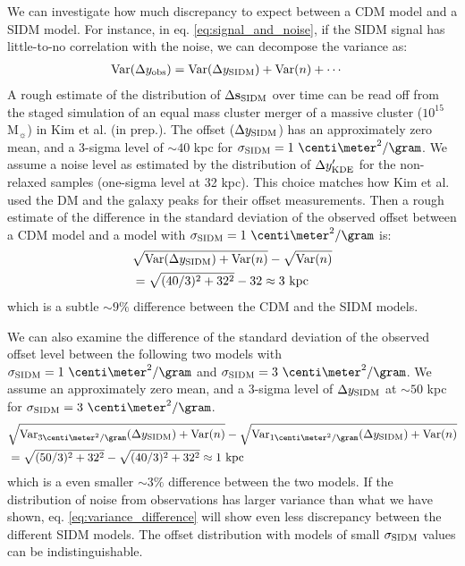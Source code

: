 We can investigate how much discrepancy to expect between a CDM model 
and a SIDM model. 
For instance, in eq. \ref{eq:signal_and_noise},
if the SIDM signal has little-to-no correlation with the noise, 
we can decompose the variance as:
\begin{align}
	\mathrm{Var}(\Delta y_{\rm obs}) &= \mathrm{Var}(\Delta y_{\rm SIDM}) + \mathrm{Var}(n) + \cdots
\end{align}
A rough estimate of the distribution of $\Delta {\bf s}_{\rm SIDM}$ over time 
can be read off from the staged simulation of an equal mass cluster merger of a
massive cluster ($10^{15}$ M$_\sun$) in Kim et al. (in prep.).
The offset ($\Delta y_{\rm SIDM}$) has an approximately zero mean, and a 3-sigma level of
$\sim 40$ kpc for $\sigma_\SIDM = 1~\centi\meter^2 / \gram$.  
We assume a noise level as estimated by the distribution of $\Delta y_{\rm KDE}'$
for the non-relaxed samples (one-sigma level at 32 kpc). This choice matches 
how Kim et al. used the DM and the galaxy peaks for their
offset measurements. 
Then a rough estimate of the difference in the standard deviation of the observed offset 
between a CDM
model and a model with $\sigma_\SIDM = 1~\centi\meter^2 / \gram$ is:
\begin{align}
&	\sqrt{\mathrm{Var}(\Delta y_{\rm SIDM}) + \mathrm{Var}(n)} - \sqrt{\mathrm{Var}(n)} \\ 
&=	\sqrt{(40 / 3)^2 + 32^2} - 32 \approx 3~\mathrm{kpc} 
\end{align}
which is a subtle $\sim 9 \%$ difference between the CDM and the SIDM models. 

We can also examine the difference of the standard deviation of the observed
offset level between the following two models with 
$\sigma_\SIDM =1~\centi\meter^2 / \gram$ and  $\sigma_\SIDM = 3~\centi\meter^2 / \gram$.
We assume an approximately zero mean, and a 3-sigma level of $\Delta y_{\rm SIDM}$
at $\sim 50$ kpc for $\sigma_\SIDM =
3~\centi\meter^2 / \gram$.
\begin{align}
&\sqrt{\Var_{3\centi\meter^2/\gram}(\Delta y_\SIDM) + \Var(n)} -
\sqrt{\Var_{1\centi\meter^2/\gram}(\Delta y_{\SIDM}) +\Var(n)}\label{eq:variance_difference}\\ 
&=\sqrt{(50 / 3)^2 + 32^2} - \sqrt{(40 / 3)^2 + 32^2} \approx 1~\mathrm{kpc} 
\end{align}
which is a even smaller $\sim 3\%$ difference between the two models. 
If the distribution of noise from observations has larger variance than what we
have shown, eq. \ref{eq:variance_difference} will show even less discrepancy
between the different SIDM models. 
The offset distribution with models of small $\sigma_{\rm SIDM}$ values 
can be indistinguishable.  

